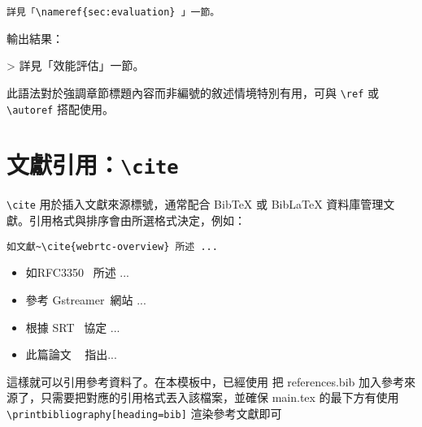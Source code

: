 \begin{verbatim}
詳見「\nameref{sec:evaluation} 」一節。
\end{verbatim}

輸出結果：

> 詳見「效能評估」一節。

此語法對於強調章節標題內容而非編號的敘述情境特別有用，可與 \verb|\ref| 或 \verb|\autoref| 搭配使用。

\section{文獻引用：\texttt{\textbackslash cite}}

\verb|\cite| 用於插入文獻來源標號，通常配合 BibTeX 或 BibLaTeX 資料庫管理文獻。引用格式與排序會由所選格式決定，例如：

\begin{verbatim}
如文獻~\cite{webrtc-overview} 所述 ...
\end{verbatim}

\begin{itemize}
\item 如RFC3350~\cite{rfc3550} 所述 ...
\item 參考 Gstreamer~\cite{gstreamer-gitlab}網站 ...
\item 根據 SRT~\cite{srt-protocol} 協定 ...
\item 此篇論文 ~\cite{hoang2018dynamic} 指出...
\end{itemize}

這樣就可以引用參考資料了。在本模板中，已經使用 \verb|| 把 references.bib 加入參考來源了，只需要把對應的引用格式丟入該檔案，並確保 main.tex 的最下方有使用 \verb|\printbibliography[heading=bib]| 渲染參考文獻即可